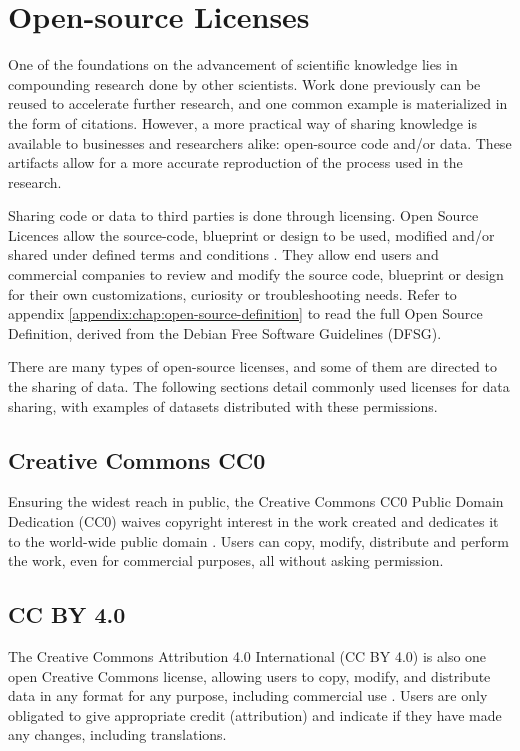\section{Open-source Licenses}

One of the foundations on the advancement of scientific knowledge lies in compounding research done by other scientists. Work done previously can be reused to accelerate further research, and one common example is materialized in the form of citations. However, a more practical way of sharing knowledge is available to businesses and researchers alike: open-source code and/or data. These artifacts allow for a more accurate reproduction of the process used in the research.

Sharing code or data to third parties is done through licensing. Open Source Licences allow the source-code, blueprint or design to be used, modified and/or shared under defined terms and conditions \cite{perens1999open}. They allow end users and commercial companies to review and modify the source code, blueprint or design for their own customizations, curiosity or troubleshooting needs. Refer to appendix \ref{appendix:chap:open-source-definition} to read the full Open Source Definition, derived from the Debian Free Software Guidelines (DFSG).

There are many types of open-source licenses, and some of them are directed to the sharing of data. The following sections detail commonly used licenses for data sharing, with examples of datasets distributed with these permissions.

\subsection{Creative Commons CC0}

Ensuring the widest reach in public, the Creative Commons CC0 Public Domain Dedication (CC0) waives copyright interest in the work created and dedicates it to the world-wide public domain \cite{licenses-cc0}. Users can copy, modify, distribute and perform the work, even for commercial purposes, all without asking permission.

\subsection{CC BY 4.0}

The Creative Commons Attribution 4.0 International (CC BY 4.0) is also one open Creative Commons license, allowing users to copy, modify, and distribute data in any format for any purpose, including commercial use \cite{licenses-ccby40}. Users are only obligated to give appropriate credit (attribution) and indicate if they have made any changes, including translations.

